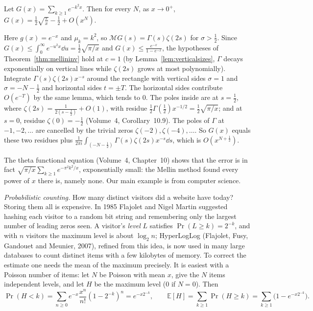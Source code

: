 \begin{example}\label{ex:thetamellin}
Let $G(x)=\sum_{k\ge1}e^{-k^2x}$. Then for every $N$, as $x\to0^+$, $G(x)=\frac12\sqrt{\frac\pi x}-\frac12+O(x^N)$.

Here $g(x)=e^{-x}$ and $\mu_k=k^2$, so $\mathcal MG(s)=\Gamma(s)\zeta(2s)$ for $\sigma>\frac12$. Since $G(x)\le\int_0^\infty e^{-u^2x}\dd u=\frac12\sqrt{\pi/x}$ and $G(x)\le\frac{e^{-x}}{1-e^{-x}}$, the hypotheses of
Theorem~\ref{thm:mellininv} hold at $c=1$ (by Lemma~\ref{lem:verticalsizes}, $\Gamma$ decays exponentially on vertical lines while $\zeta(2s)$ grows at most polynomially). Integrate $\Gamma(s)\zeta(2s)x^{-s}$ around the
rectangle with vertical sides $\sigma=1$ and $\sigma=-N-\frac12$ and horizontal sides $t=\pm T$. The horizontal sides contribute $O(e^{-T})$ by the same lemma, which tends to $0$. The poles inside are at
$s=\frac12$, where $\zeta(2s)=\frac1{2(s-\frac12)}+O(1)$, with residue $\frac12\Gamma(\frac12)x^{-1/2}=\frac12\sqrt{\pi/x}$; and at $s=0$, residue $\zeta(0)=-\frac12$ (Volume~4, Corollary~10.9). The poles of $\Gamma$ at
$-1,-2,\dots$ are cancelled by the trivial zeros $\zeta(-2),\zeta(-4),\dots$. So $G(x)$ equals these two residues plus $\frac1{2\pi i}\int_{(-N-\frac12)}\Gamma(s)\zeta(2s)x^{-s}\dd s$, which is $O(x^{N+\frac12})$.
\end{example}

The theta functional equation (Volume~4, Chapter~10) shows that the error is in fact $\sqrt{\pi/x}\sum_{k\ge1}e^{-\pi^2k^2/x}$, exponentially small: the Mellin method found every power of $x$ there is, namely none.
Our main example is from computer science.

\emph{Probabilistic counting.} How many distinct visitors did a website have today? Storing them all is expensive. In 1985 Flajolet and Nigel Martin suggested hashing each visitor to a random bit
string and remembering only the largest number of leading zeros seen. A visitor's \emph{level} $L$ satisfies $\Pr(L\ge k)=2^{-k}$, and with $n$ visitors the maximum level is about $\log_2n$; HyperLogLog
(Flajolet, Fusy, Gandouet and Meunier, 2007), refined from this idea, is now used in many large databases to count distinct items with a few kilobytes of memory. To correct the estimate one needs the
mean of the maximum precisely. It is easiest with a Poisson number of items: let $N$ be Poisson with mean $x$, give the $N$ items independent levels, and let $H$ be the maximum level ($0$ if $N=0$).
Then
\[
\Pr(H<k)=\sum_{n\ge0}e^{-x}\frac{x^n}{n!}(1-2^{-k})^n=e^{-x2^{-k}},\qquad\mathbb E[H]=\sum_{k\ge1}\Pr(H\ge k)=\sum_{k\ge1}\bigl(1-e^{-x2^{-k}}\bigr).
\]

